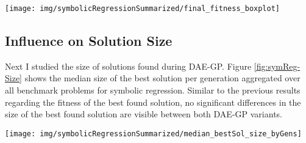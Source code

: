 \documentclass[
  11pt,
]{article}
\let\origfigure\figure
\let\endorigfigure\endfigure
\renewenvironment{figure}[1][2] {
    \expandafter\origfigure\expandafter[H]
} {
    \endorigfigure
}
\begin{document}
\begin{figure}[c]

{\centering \texttt{[image: img/symbolicRegressionSummarized/final\_fitness\_boxplot]} 

}

\caption{Fitness after 30 Generations - Real World Symbolic Regression}\label{fig:symReg-Fitness-BoxPlots}
\end{figure}

\hypertarget{influence-on-solution-size}{%
\subsection{Influence on Solution Size}\label{influence-on-solution-size}}

Next I studied the size of solutions found during DAE-GP.
Figure \ref{fig:symReg-Size} shows the median size of the best solution per generation aggregated over all benchmark problems for symbolic regression.
Similar to the previous results regarding the fitness of the best found solution, no significant differences in the size of the best found solution are visible between both DAE-GP variants.

\begin{figure}[c]

{\centering \texttt{[image: img/symbolicRegressionSummarized/median\_bestSol\_size\_byGens]} 

}

\caption{Size of the best Solution over 30 Generations - Real World Symbolic Regression}\label{fig:symReg-Size}
\end{figure}
\end{document}
